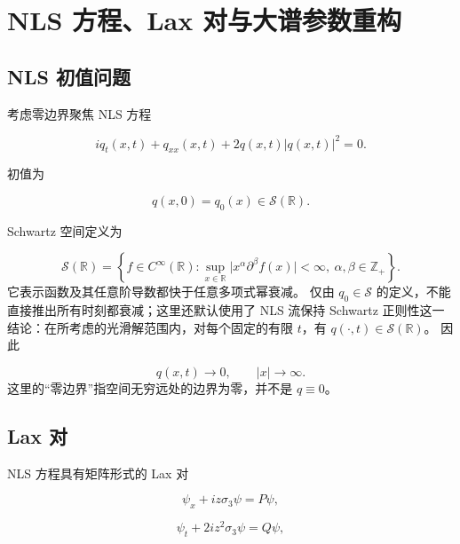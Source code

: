 \documentclass[
    lang=cn,
    scheme=chinese,
    mode=simple,
    device=normal,
    color=blue,
    math=cm,
    thmcnt=section,
    12pt,
    nowatermark
]{elegantbook}
\begin{document}
\section{NLS 方程、Lax 对与大谱参数重构}

\subsection{NLS 初值问题}

考虑零边界聚焦 NLS 方程

\begin{equation}
    iq_t(x,t)+q_{xx}(x,t)+2q(x,t)\lvert q(x,t)\rvert^2=0.
    \tag{5.1.1}
    \label{eq:5.1.1}
\end{equation}

初值为

\begin{equation}
    q(x,0)=q_0(x)\in\mathcal S(\mathbb{R}).
    \tag{5.1.2}
    \label{eq:5.1.2}
\end{equation}

\begin{callout}
    Schwartz 空间定义为

    \[
        \mathcal S(\mathbb{R})=
        \left\{
        f\in C^\infty(\mathbb{R}):
        \sup_{x\in\mathbb{R}}\lvert x^\alpha\partial^\beta f(x)\rvert<\infty,\
        \alpha,\beta\in\mathbb{Z}_+
        \right\}.
    \]
    它表示函数及其任意阶导数都快于任意多项式幂衰减。
    仅由 $q_0\in\mathcal S$ 的定义，不能直接推出所有时刻都衰减；这里还默认使用了 NLS 流保持 Schwartz 正则性这一结论：在所考虑的光滑解范围内，对每个固定的有限 $t$，有 $q(\cdot,t)\in\mathcal S(\mathbb{R})$。
    因此

    \[
        q(x,t)\to0,\qquad \lvert x\rvert\to\infty.
    \]
    这里的``零边界''指空间无穷远处的边界为零，并不是 $q\equiv0$。
\end{callout}

\subsection{Lax 对}

NLS 方程具有矩阵形式的 Lax 对

\begin{equation}
    \psi_x+iz\sigma_3\psi=P\psi,
    \tag{5.1.3}
    \label{eq:5.1.3}
\end{equation}

\begin{equation}
    \psi_t+2iz^2\sigma_3\psi=Q\psi,
    \tag{5.1.4}
    \label{eq:5.1.4}
\end{equation}
\end{document}
